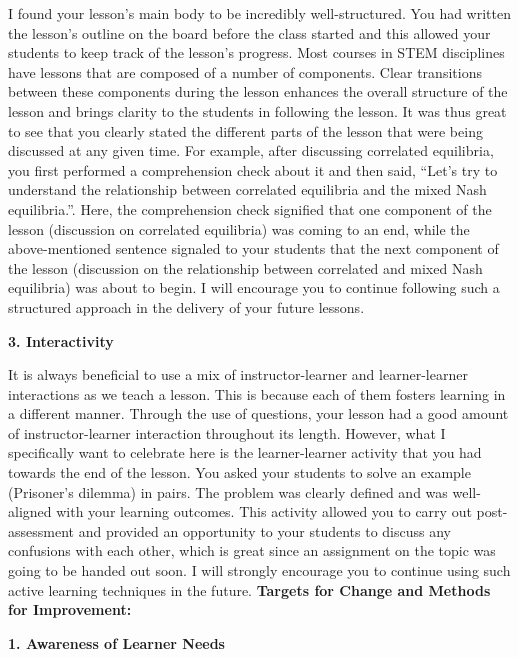 \documentclass{article}
\begin{document}
I found your lesson’s main body to be incredibly well-structured. You had written the lesson’s outline on the board before the class started and this allowed your students to keep track of the lesson’s progress. Most courses in STEM disciplines have lessons that are composed of a number of components. Clear transitions between these components during the lesson enhances the overall structure of the lesson and brings clarity to the students in following the lesson. It was thus great to see that you clearly stated the different parts of the lesson that were being discussed at any given time. For example, after discussing correlated equilibria, you first performed a comprehension check about it and then said, “Let’s try to understand the relationship between correlated equilibria and the mixed Nash equilibria.”. Here, the comprehension check signified that one component of the lesson (discussion on correlated equilibria) was coming to an end, while the above-mentioned sentence signaled to your students that the next component of the lesson (discussion on the relationship between correlated and mixed Nash equilibria) was about to begin. I will encourage you to continue following such a structured approach in the delivery of your future lessons.

\textbf{3. Interactivity}

It is always beneficial to use a mix of instructor-learner and learner-learner interactions as we teach a lesson. This is because each of them fosters learning in a different manner. Through the use of questions, your lesson had a good amount of instructor-learner interaction throughout its length. However, what I specifically want to celebrate here is the learner-learner activity that you had towards the end of the lesson. You asked your students to solve an example (Prisoner’s dilemma) in pairs. The problem was clearly defined and was well-aligned with your learning outcomes. This activity allowed you to carry out post-assessment and provided an opportunity to your students to discuss any confusions with each other, which is great since an assignment on the topic was going to be handed out soon. I will strongly encourage you to continue using such active learning techniques in the future.\newline
\textbf{Targets for Change and Methods for Improvement:}

\textbf{1. Awareness of Learner Needs}
\end{document}
